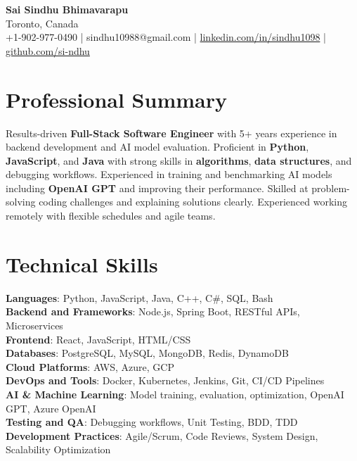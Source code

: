 \documentclass[letterpaper,11pt]{article}
\begin{document}
\begin{center}
  {\Large \textbf{Sai Sindhu Bhimavarapu}} \\
  Toronto, Canada \\
  +1-902-977-0490 \enspace | \enspace sindhu10988@gmail.com \enspace | \enspace \href{https://www.linkedin.com/in/sindhu1098/}{linkedin.com/in/sindhu1098} \enspace | \enspace \href{https://github.com/si-ndhu}{github.com/si-ndhu}
\end{center}

\section{Professional Summary}
  \begin{itemize}[leftmargin=0.15in, label={}]
    \small{\item{
     Results-driven \textbf{Full-Stack Software Engineer} with 5+ years experience in backend development and AI model evaluation. Proficient in \textbf{Python}, \textbf{JavaScript}, and \textbf{Java} with strong skills in \textbf{algorithms}, \textbf{data structures}, and debugging workflows. Experienced in training and benchmarking AI models including \textbf{OpenAI GPT} and improving their performance. Skilled at problem-solving coding challenges and explaining solutions clearly. Experienced working remotely with flexible schedules and agile teams.
    }}
  \end{itemize}
\vspace{-16pt}

\section{Technical Skills}
 \begin{itemize}[leftmargin=0.15in, label={}]
    \small{\item{
     \textbf{Languages}: Python, JavaScript, Java, C++, C\#, SQL, Bash \\
     \textbf{Backend and Frameworks}: Node.js, Spring Boot, RESTful APIs, Microservices \\
     \textbf{Frontend}: React, JavaScript, HTML/CSS \\
     \textbf{Databases}: PostgreSQL, MySQL, MongoDB, Redis, DynamoDB \\
     \textbf{Cloud Platforms}: AWS, Azure, GCP \\
     \textbf{DevOps and Tools}: Docker, Kubernetes, Jenkins, Git, CI/CD Pipelines \\
     \textbf{AI & Machine Learning}: Model training, evaluation, optimization, OpenAI GPT, Azure OpenAI \\
     \textbf{Testing and QA}: Debugging workflows, Unit Testing, BDD, TDD \\
     \textbf{Development Practices}: Agile/Scrum, Code Reviews, System Design, Scalability Optimization
    }}
 \end{itemize}
\vspace{-16pt}
\end{document}
